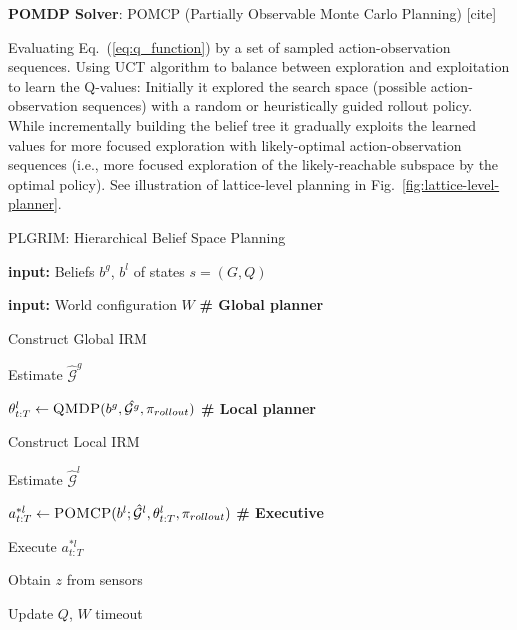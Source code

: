 \documentclass[letterpaper]{article} %
\newcommand{\ph}[1]{{\textbf{#1}:}} %
\begin{document}
\ph{POMDP Solver}
POMCP (Partially Observable Monte Carlo Planning) [cite]

Evaluating Eq.~(\ref{eq:q_function}) by a set of sampled action-observation sequences.
Using UCT algorithm to balance between exploration and exploitation to learn the Q-values:
Initially it explored the search space (possible action-observation sequences) with a random or heuristically guided rollout policy.
While incrementally building the belief tree it gradually exploits the learned values for more focused exploration with likely-optimal action-observation sequences (i.e., more focused exploration of the likely-reachable subspace by the optimal policy).
See illustration of lattice-level planning in Fig.~\ref{fig:lattice-level-planner}.




\begin{algorithm}[t!]
{\fontsize{8.5pt}{9.8pt}\selectfont
\caption{PLGRIM: Hierarchical Belief Space Planning}
\label{alg:PLGRIM}
\begin{algorithmic}
\STATE
\item \textbf{input: }Beliefs $b^g$, $b^l$ of states $s=(G, Q)$
\item \textbf{input: }World configuration $W$
\REPEAT
    \STATE \textbf{\# Global planner}
    \item Construct Global IRM
    \item Estimate $\hat{\mathcal{G}}^g$
    \item $\theta^l_{t:T} \gets \textsc{QMDP}(b^g, \hat{\mathcal{G}^g}, \pi_{rollout})$
    \STATE \textbf{\# Local planner}
    \item Construct Local IRM
    \item Estimate $\hat{\mathcal{G}}^l$
    \item $a_{t:T}^{*l} \gets \textsc{POMCP}(b^l;\hat{\mathcal{G}}^l, \theta^l_{t:T}, \pi_{rollout})$ 
    \STATE \textbf{\# Executive}
    \item Execute $a_{t:T}^{*l}$
    \item Obtain $z$ from sensors
    \item Update $Q$, $W$
\UNTIL timeout
\end{algorithmic}
} %
\end{algorithm}
\end{document}
